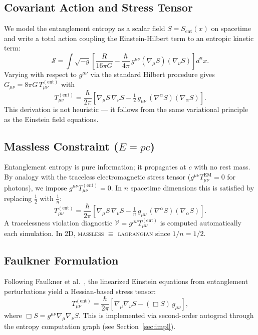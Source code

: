 \documentclass[12pt,a4paper]{article}
\newcommand{\Sent}{S_{\mathrm{ent}}}
\newcommand{\Tent}{T^{(\mathrm{ent})}_{\mu\nu}}
\newcommand{\hb}{\hbar}
\newcommand{\Gmn}{G_{\mu\nu}}
\newcommand{\gmn}{g_{\mu\nu}}
\newcommand{\nmu}{\nabla_\mu}
\newcommand{\nnu}{\nabla_\nu}
\begin{document}
\subsection{Covariant Action and Stress Tensor}

We model the entanglement entropy as a scalar field $S=\Sent(x)$ on spacetime
and write a total action coupling the Einstein-Hilbert term to an entropic
kinetic term:
%
\begin{equation}
  \mathcal{S} = \int \sqrt{-g}
  \left[
    \frac{R}{16\pi G}
    - \frac{\hb}{4\pi}\, g^{\mu\nu}(\nmu S)(\nnu S)
  \right] d^n x.
  \label{eq:action}
\end{equation}
%
Varying with respect to $g^{\mu\nu}$ via the standard Hilbert procedure gives
$\Gmn = 8\pi G\,\Tent$ with
%
\begin{equation}
  \Tent = \frac{\hb}{2\pi}
  \left[
    \nmu S\,\nnu S
    - \tfrac{1}{2}\,\gmn\,(\nabla^\alpha S)(\nabla_\alpha S)
  \right].
  \tag{LAGRANGIAN}
  \label{eq:T_lag}
\end{equation}
%
This derivation is not heuristic --- it follows from the same variational
principle as the Einstein field equations.

\subsection{Massless Constraint ($E=pc$)}

Entanglement entropy is pure information; it propagates at $c$ with no rest
mass. By analogy with the traceless electromagnetic stress tensor
($g^{\mu\nu}T_{\mu\nu}^{\mathrm{EM}}=0$ for photons), we impose
$g^{\mu\nu}\Tent=0$.
In $n$ spacetime dimensions this is satisfied by replacing $\tfrac{1}{2}$
with $\tfrac{1}{n}$:
%
\begin{equation}
  \Tent = \frac{\hb}{2\pi}
  \left[
    \nmu S\,\nnu S
    - \tfrac{1}{n}\,\gmn\,(\nabla^\alpha S)(\nabla_\alpha S)
  \right].
  \tag{MASSLESS}
  \label{eq:T_massless}
\end{equation}
%
A tracelessness violation diagnostic
$\mathcal{V}=g^{\mu\nu}\Tent$ is computed automatically each simulation.
In 2D, \textsc{massless} $\equiv$ \textsc{lagrangian} since $1/n=1/2$.

\subsection{Faulkner Formulation}

Following Faulkner et al.\ \cite{faulkner2014}, the linearized Einstein
equations from entanglement perturbations yield a Hessian-based stress tensor:
%
\begin{equation}
  \Tent = \frac{\hb}{2\pi}
  \left[
    \nmu\nnu S - (\Box S)\,\gmn
  \right],
  \tag{FAULKNER}
  \label{eq:T_faulk}
\end{equation}
%
where $\Box S = g^{\mu\nu}\nmu\nnu S$.
This is implemented via second-order autograd through the entropy computation
graph (see Section~\ref{sec:impl}).
\end{document}
